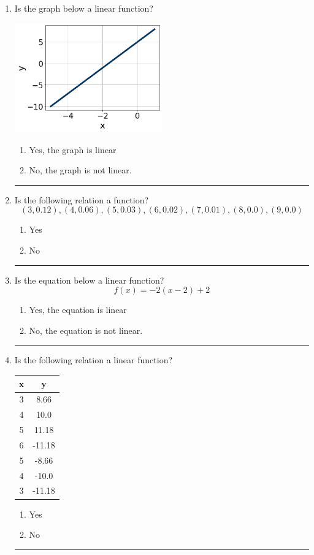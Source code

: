 \documentclass[14pt]{extbook}
\newcommand{\litem}[1]{\item#1\hspace*{-1cm}\rule{\textwidth}{0.4pt}}
\begin{document}
\begin{enumerate}
{\begin{enumerate}[label=\Alph*.]
\end{enumerate} }
\litem{
Is the graph below a linear function?
\begin{center}
    \includegraphics[width=0.5\textwidth]{../Figures/MA_8_F_1_2_graphD.png}
\end{center}
\begin{enumerate}[label=\Alph*.]
\item Yes, the graph is linear
\item No, the graph is not linear.

\end{enumerate} }
\litem{
Is the following relation a function?\[ (3, 0.12), (4, 0.06), (5, 0.03), (6, 0.02), (7, 0.01), (8, 0.0), (9, 0.0) \]\begin{enumerate}[label=\Alph*.]
\item Yes
\item No

\end{enumerate} }
\litem{
Is the equation below a linear function?\[ f(x) = -2(x -2)+2 \]\begin{enumerate}[label=\Alph*.]
\item Yes, the equation is linear
\item No, the equation is not linear.

\end{enumerate} }
\litem{
Is the following relation a linear function?

\begin{tabular}{c|c}
x &y\tabularnewline \hline
3 &8.66\tabularnewline \hline
4 &10.0\tabularnewline \hline
5 &11.18\tabularnewline \hline
6 &-11.18\tabularnewline \hline
5 &-8.66\tabularnewline \hline
4 &-10.0\tabularnewline \hline
3 &-11.18\end{tabular}\begin{enumerate}[label=\Alph*.]
\item Yes
\item No


\end{enumerate}}
\end{enumerate}
\end{document}
